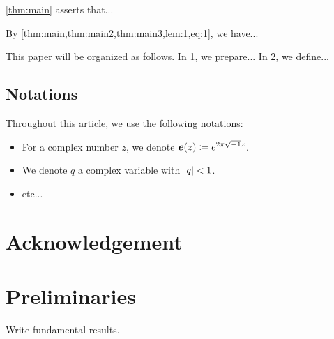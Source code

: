 \documentclass[11pt,a4paper,lualatex]{amsart}
\numberwithin{equation}{section} %
\begin{document}
\cref{thm:main} asserts that...

By \cref{thm:main,thm:main2,thm:main3,lem:1,eq:1}, we have...

\vspace{1em}

This paper will be organized as follows. 
In \cref{sec:preliminaries}, we prepare...
In \cref{sec:3}, we define...


\subsection*{Notations}


Throughout this article, we use the following notations:

\begin{itemize}
	\item For a complex number $ z $, we denote $ \bm{e}(z) \coloneqq e^{2\pi\sqrt{-1} z} $.
	\item We denote $ q $ a complex variable with $ \left\lvert q\right\rvert < 1 $.
	\item etc...
\end{itemize}



\section*{Acknowledgement} \label{sec:acknowledgement}




\section{Preliminaries} \label{sec:preliminaries}


Write fundamental results.


\section{} \label{sec:3}
\end{document}
